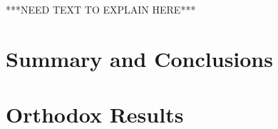 \documentclass{article}
\begin{document}



***NEED TEXT TO EXPLAIN HERE*** 

\section{Summary and Conclusions}




\nocite{*}
 


\section{Orthodox Results}\label{OrthResults}
\end{document}
